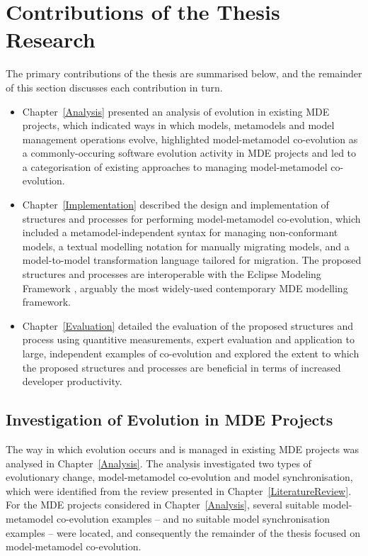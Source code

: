 
\section{Contributions of the Thesis Research}
The primary contributions of the thesis are summarised below, and the remainder of this section discusses each contribution in turn.

\begin{itemize}
	\item Chapter~\ref{Analysis} presented an analysis of evolution in existing MDE projects, which indicated ways in which models, metamodels and model management operations evolve, highlighted model-metamodel co-evolution as a commonly-occuring software evolution activity in MDE projects and led to a categorisation of existing approaches to managing model-metamodel co-evolution.
	\item Chapter~\ref{Implementation} described the design and implementation of structures and processes for performing model-metamodel co-evolution, which included a metamodel-independent syntax for managing non-conformant models, a textual modelling notation for manually migrating models, and a model-to-model transformation language tailored for migration. The proposed structures and processes are interoperable with the Eclipse Modeling Framework \cite{steinberg09emf}, arguably the most widely-used contemporary MDE modelling framework.
	\item Chapter~\ref{Evaluation} detailed the evaluation of the proposed structures and process using quantitive measurements, expert evaluation and application to large, independent examples of co-evolution and explored the extent to which the proposed structures and processes are beneficial in terms of increased developer productivity.
\end{itemize}


\subsection{Investigation of Evolution in MDE Projects}
The way in which evolution occurs and is managed in existing MDE projects was analysed in Chapter~\ref{Analysis}. The analysis investigated two types of evolutionary change, model-metamodel co-evolution and model synchronisation, which were identified from the review presented in Chapter~\ref{LiteratureReview}. For the MDE projects considered in Chapter~\ref{Analysis}, several suitable model-metamodel co-evolution examples -- and no suitable model synchronisation examples -- were located, and consequently the remainder of the thesis focused on model-metamodel co-evolution.

